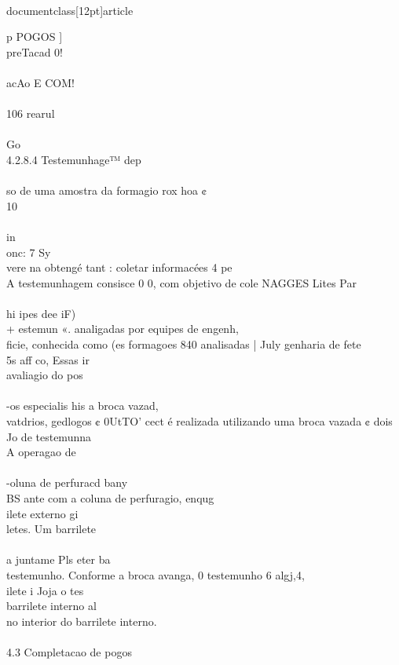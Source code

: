 \\documentclass[12pt]{article}
\begin{document}
p POGOS ]\\
preTacad 0!\\
\\
acAo E COM!\\
\\
106 rearul\\
\\
Go\\
4.2.8.4 Testemunhage™ dep\\
\\
so de uma amostra da formagio rox hoa ¢\\
10\\
\\
in\\
onc: 7 Sy\\
vere na obtengé tant : coletar informacées 4 pe\\
A testemunhagem consisce 0 0, com objetivo de cole NAGGES Lites Par\\
\\
hi ipes dee iF)\\
+ estemun «. analigadas por equipes de engenh,\\
ficie, conhecida como (es formagoes 840 analisadas | July genharia de fete\\
5s aff co, Essas ir\\
avaliagio do pos\\
\\
-os especialis his a broca vazad,\\
vatdrios, gedlogos ¢ 0UtTO' cect é realizada utilizando uma broca vazada ¢ dois\\
Jo de testemunna\\
A operagao de\\
\\
-oluna de perfuracd bany\\
BS ante com a coluna de perfuragio, enqug\\
ilete externo gi\\
letes. Um barrilete\\
\\
a juntame Pls eter ba\\
testemunho. Conforme a broca avanga, 0 testemunho 6 algj,4,\\
ilete i Joja o tes\\
barrilete interno al\\
no interior do barrilete interno.\\
\\
4.3 Completacao de pogos\\
\\
\end{document}
